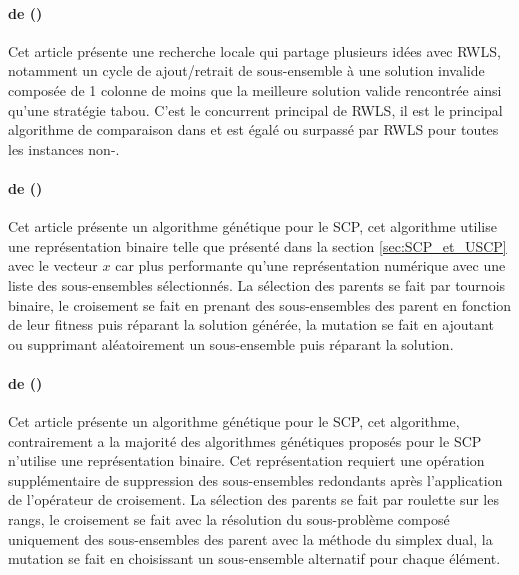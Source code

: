 \documentclass[a4paper,11pt,twoside,french,report]{../common/simplem}
\begin{document}
				\paragraph*{ de \citeauthor{Musliu2006} (\citeyear{Musliu2006})~\cite{Musliu2006}\\}
					Cet article présente une recherche locale qui partage plusieurs idées avec \gls{RWLS}, notamment un cycle de ajout/retrait de sous-ensemble à une solution invalide composée de 1 colonne de moins que la meilleure solution valide rencontrée ainsi qu'une stratégie tabou. C'est le concurrent principal de \gls{RWLS}, il est le principal algorithme de comparaison dans \cite{Gao2015} et est égalé ou surpassé par \gls{RWLS} pour toutes les instances non-.
				\paragraph*{ de \citeauthor{Beasley1996} (\citeyear{Beasley1996})~\cite{Beasley1996}\\}
					Cet article présente un algorithme génétique pour le \gls{SCP}, cet algorithme utilise une représentation binaire telle que présenté dans la section \ref{sec:SCP_et_USCP} avec le vecteur \(x\) car plus performante qu'une représentation numérique avec une liste des sous-ensembles sélectionnés. La sélection des parents se fait par tournois binaire, le croisement se fait en prenant des sous-ensembles des parent en fonction de leur fitness puis réparant la solution générée, la mutation se fait en ajoutant ou supprimant aléatoirement un sous-ensemble puis réparant la solution.
				\paragraph*{ de \citeauthor{Eremeev1999} (\citeyear{Eremeev1999})~\cite{Eremeev1999}\\}
					Cet article présente un algorithme génétique pour le \gls{SCP}, cet algorithme, contrairement a la majorité des algorithmes génétiques proposés pour le \gls{SCP} n'utilise une représentation binaire. Cet représentation requiert une opération supplémentaire de suppression des sous-ensembles redondants après l'application de l'opérateur de croisement. La sélection des parents se fait par roulette sur les rangs, le croisement se fait avec la résolution du sous-problème composé uniquement des sous-ensembles des parent avec la méthode du simplex dual, la mutation se fait en choisissant un sous-ensemble alternatif pour chaque élément.
\end{document}
